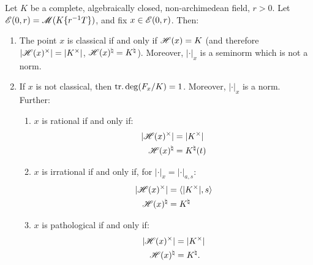 \begin{theorem}
Let $K$ be a complete, algebraically closed, non-archimedean field, $r>0$. 
Let $\mathscr{E}(0,r) = \operatorname{\mathscr{M}}(K\{ r^{-1} T \})$, and fix $x\in \mathscr{E}(0,r)$. Then: 
\begin{enumerate}
\item
The point $x$ is classical if and only if $\mathscr{H}(x)=K$ (and therefore 
$|\mathscr{H}(x)^\times|=|K^\times|$, $\mathscr{H}(x)^\natural=K^\natural$). Moreover, 
$|\cdot|_x$ is a seminorm which is not a norm. 

\item
If $x$ is not classical, then $\operatorname{tr.deg}(F_x/K)=1$. Moreover, $|\cdot|_x$ is a 
norm. Further:
\begin{enumerate}
\item
$x$ is rational if and only if: 
\begin{align*}
	|\mathscr{H}(x)^\times| &= |K^\times| \\
	\mathscr{H}(x)^\natural &= K^\natural(t) 
\end{align*}

\item
$x$ is irrational if and only if, for $|\cdot|_x=|\cdot|_{a,s}$:
\begin{align*}
	|\mathscr{H}(x)^\times| &= \langle |K^\times|,s\rangle \\
	\mathscr{H}(x)^\natural &= K^\natural 
\end{align*}

\item
$x$ is pathological if and only if: 
\begin{align*}
	|\mathscr{H}(x)^\times| &= |K^\times| \\
	\mathscr{H}(x)^\natural &= K^\natural .
\end{align*}
\end{enumerate}
\end{enumerate}
\end{theorem}

